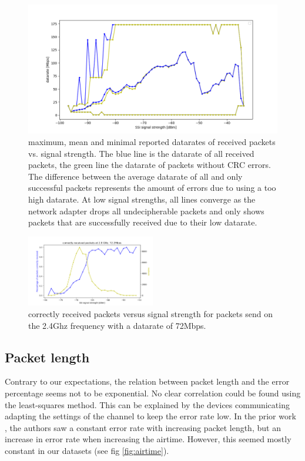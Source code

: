 \documentclass{IEEEtran}
\begin{document}
\begin{figure}
		\includegraphics[width=\textwidth]{figures/datarate_signal.png}
		\caption{maximum, mean and minimal reported datarates of received packets vs. signal strength. The blue line is the datarate of all received packets, the green line the datarate of packets without CRC errors. The difference between the average datarate of all and only successful packets represents the amount of errors due to using a too high datarate. At low signal strengths, all lines converge as the network adapter drops all undecipherable packets and only shows packets that are successfully received due to their low datarate.}
		\label{fig:datasignal}
\end{figure}

\begin{figure}
		\includegraphics[width=0.5\textwidth]{figures/24ghz72mbps.png}
		\caption{correctly received packets versus signal strength for packets send on the 2.4Ghz frequency with a datarate of 72Mbps.}
		\label{fig:singledatarate}
\end{figure}

\subsection{Packet length}

Contrary to our expectations, the relation between packet length and the error percentage seems not to be exponential. No clear correlation could be found using the least-squares method. This can be explained by the devices communicating adapting the settings of the channel to keep the error rate low. In the prior work \cite{7317401}, the authors saw a constant error rate with increasing packet length, but an increase in error rate when increasing the airtime. However, this seemed mostly constant in our datasets (see fig \ref{fig:airtime}). 
\end{document}
